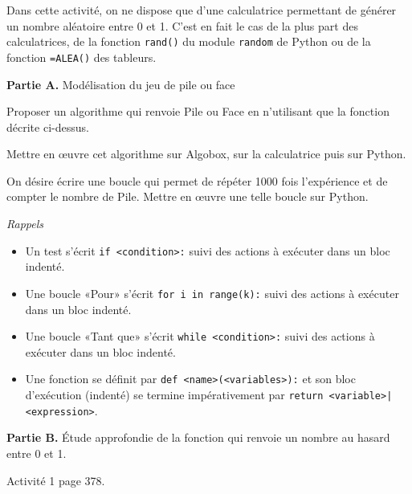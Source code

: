 \documentclass[11pt,a4paper,french]{article}
\begin{document}
Dans cette activité, on ne dispose que d'une calculatrice permettant de
générer un nombre aléatoire entre 0 et 1. C'est en fait le cas de la
plus part des calculatrices, de la fonction \texttt{rand()} du module
\texttt{random} de Python ou de la fonction \texttt{=ALEA()} des
tableurs.

\textbf{Partie A.} Modélisation du jeu de pile ou face

Proposer un algorithme qui renvoie Pile ou Face en n'utilisant que la
fonction décrite ci-dessus.

Mettre en œuvre cet algorithme sur Algobox, sur la calculatrice puis sur
Python.

On désire écrire une boucle qui permet de répéter 1000 fois l'expérience
et de compter le nombre de Pile. Mettre en œuvre une telle boucle sur
Python.

\emph{Rappels}
\begin{itemize}
  \item Un test s'écrit \texttt{if <condition>:} suivi des actions à
    exécuter dans un bloc indenté.
  \item Une boucle «Pour» s'écrit \texttt{for i in range(k):} suivi des
    actions à exécuter dans un bloc indenté.
  \item Une boucle «Tant que» s'écrit \texttt{while <condition>:} suivi
    des actions à exécuter dans un bloc indenté.
  \item Une fonction se définit par \texttt{def <name>(<variables>):} et
    son bloc d'exécution (indenté) se termine impérativement par
    \texttt{return <variable>|<expression>}.
\end{itemize}

\textbf{Partie B.} Étude approfondie de la fonction qui renvoie un
nombre au hasard entre 0 et 1.

Activité 1 page 378.
\end{document}
